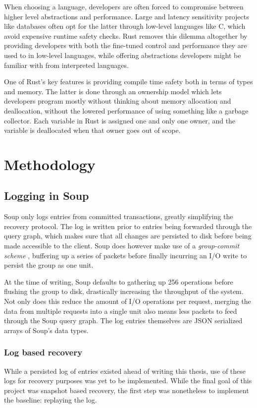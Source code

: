 \documentclass[b5paper]{report}
\begin{document}
When choosing a language, developers are often forced to compromise between
higher level abstractions and performance. Large and latency sensitivity projects
like databases often opt for the latter through low-level languages like C,
which avoid expensive runtime safety checks. Rust removes this dilemma
altogether by providing developers with both the fine-tuned control and
performance they are used to in low-level languages, while offering abstractions
developers might be familiar with from interpreted languages.

One of Rust's key features is providing compile time safety both in terms of
types and memory. The latter is done through an ownership model which lets
developers program mostly without thinking about memory allocation and
deallocation, without the lowered performance of using something like a garbage
collector. Each variable in Rust is assigned one and only one owner, and the
variable is deallocated when that owner goes out of scope.

\chapter{Methodology} \label{chap:methodology}

\section{Logging in Soup} \label{sec:logging}
Soup only logs entries from committed transactions, greatly simplifying the
recovery protocol. The log is written prior to entries being forwarded
through the query graph, which makes sure that all changes are persisted to disk
before being made accessible to the client. Soup does however make use of a
\textit{group-commit scheme} \cite{main-memory}, buffering up a series of
packets before finally incurring an I/O write to persist the group as one unit.

At the time of writing, Soup defaults to gathering up 256 operations before
flushing the group to disk, drastically increasing the throughput of the system.
Not only does this reduce the amount of I/O operations per request, merging the
data from multiple requests into a single unit also means less packets to feed
through the Soup query graph. The log entries themselves are JSON \cite{json}
serialized arrays of Soup's data types.

\subsection{Log based recovery} \label{sec:log-replay}
While a persisted log of entries existed ahead of writing this thesis, use of
these logs for recovery purposes was yet to be implemented. While the final goal
of this project was snapshot based recovery, the first step was nonetheless to
implement the baseline: replaying the log.
\end{document}
